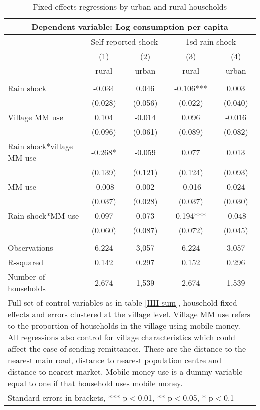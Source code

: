 \begin{table}
\centering
\caption{Fixed effects regressions by urban and rural  households} \label{urban rural}
\begin{tabular}{lcccc}
\multicolumn{5}{c}{Dependent variable: Log consumption per capita} \\ \hline
& \multicolumn{2}{c}{Self reported shock} & \multicolumn{2}{c}{1sd rain shock} \\
 & (1) & (2) & (3) & (4) \\
 & rural & urban& rural & urban  \\ \hline
 &  &  &  &  \\
Rain shock & -0.034 & 0.046    & -0.106*** & 0.003   \\
  & (0.028) & (0.056) & (0.022) & (0.040)  \\
Village MM use & 0.104 & -0.014 & 0.096 & -0.016 \\
 & (0.096) & (0.061) & (0.089) & (0.082) \\
Rain shock*village MM use & -0.268* & -0.059 & 0.077 & 0.013   \\
 & (0.139) & (0.121) & (0.124) & (0.093)  \\
MM use & -0.008 & 0.002 & -0.016 & 0.024 \\
 & (0.037) & (0.028) & (0.037) & (0.030) \\
Rain shock*MM use & 0.097 & 0.073  & 0.194*** & -0.048   \\
 & (0.060) & (0.087)   & (0.072) & (0.045)  \\
 &  &  &  &  \\
Observations & 6,224 & 3,057 & 6,224 & 3,057 \\
R-squared & 0.142 & 0.297 & 0.152 & 0.296 \\
Number of households & 2,674 & 1,539 & 2,674 & 1,539 \\\hline
\multicolumn{5}{p{11cm}}{Full set of control variables as in table \ref{HH sum}, household fixed effects and errors clustered at the village level. Village MM use refers to the proportion of households in the village using mobile money. All regressions also control for village characteristics which could affect the ease of sending remittances. These are the distance to the nearest main road, distance to nearest population centre and distance to nearest market. Mobile money use is a dummy variable equal to one if that household uses mobile money.} \\
\multicolumn{5}{l}{ Standard errors in brackets, *** p$<$0.01, ** p$<$0.05, * p$<$0.1} \\
\end{tabular}
\end{table}
